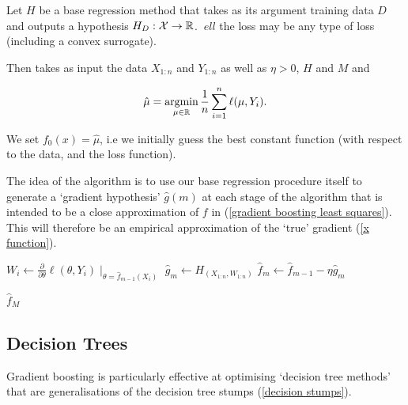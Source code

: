 \documentclass[11pt]{scrartcl}
\begin{document}
\begin{definition}
Let $H$ be a base regression method that takes as its argument training data $D$ and outputs a hypothesis $H_D : \mathcal{X} \rightarrow \mathbb R$. $\
ell$ the loss may be any type of loss (including a convex surrogate).

Then  takes as input the data $X_{1:n}$ and $Y_{1:n}$ as well as $\eta > 0$, $H$ and $M$ and

\begin{equation}
    \hat{\mu} = \operatorname*{arg min}_{\mu \in \mathbb R} \frac1n \sum_{i=1}^n \ell(\mu, Y_i).
\end{equation}

We set $f_0(x) = \hat{\mu}$, i.e we initially guess the best constant function (with respect to the data, and the loss function).

The idea of the algorithm is to use our base regression procedure itself to generate a `gradient hypothesis' $\hat{g}(m)$ at each stage of the algorithm that is intended to be a close approximation of $f$ in (\ref{gradient boosting least squares}). This will therefore be an empirical approximation of the `true' gradient (\ref{x function}).

\begin{algorithmic}
    \State $W_i \gets \frac{\partial}{\partial \theta} \ell (\theta, Y_i) \mid_{\theta = \hat{f}_{m-1}(X_i)}$ 
    \State $\hat{g}_m \gets H_{(X_{1:n}, W_{1:n})}$ 
    \State $\hat{f}_m \gets \hat{f}_{m-1} - \eta \hat{g}_m$
\EndFor

\Return $\hat{f}_M$  %
\label{gradient boosting}

\end{algorithmic}
\end{definition}

\subsection{Decision Trees}

Gradient boosting is particularly effective at optimising `decision tree methods' that are generalisations of the decision tree stumps (\ref{decision stumps}).
\end{document}
